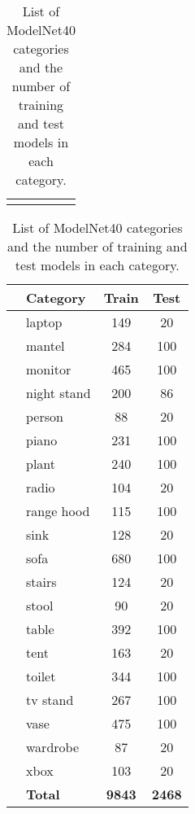 \begin{table}[]
\begin{tabular}[t]{lccl}
		                  &                &
	\end{tabular}
     \bigskip
	\begin{tabular}[t]{llcc}
		\hline
		\hspace{4pt} & \textbf{Category} & \textbf{Train} & \textbf{Test} \\ \hline
		             & laptop            & 149            & 20            \\
		             & mantel            & 284            & 100           \\
		             & monitor           & 465            & 100           \\
		             & night stand       & 200            & 86            \\
		             & person            & 88             & 20            \\
		             & piano             & 231            & 100           \\
		             & plant             & 240            & 100           \\
		             & radio             & 104            & 20            \\
		             & range hood        & 115            & 100           \\
		             & sink              & 128            & 20            \\
		             & sofa              & 680            & 100           \\
		             & stairs            & 124            & 20            \\
		             & stool             & 90             & 20            \\
		             & table             & 392            & 100           \\
		             & tent              & 163            & 20            \\
		             & toilet            & 344            & 100           \\
		             & tv stand          & 267            & 100           \\
		             & vase              & 475            & 100           \\
		             & wardrobe          & 87             & 20            \\
		             & xbox              & 103            & 20            \\
		             & \textbf{Total}    & \textbf{9843 } & \textbf{2468} \\ \hline

	\end{tabular}
	
	\caption{List of ModelNet40 categories and the number of training and test models in each category.}
	\label{Table:modelnetcats}
\end{table}